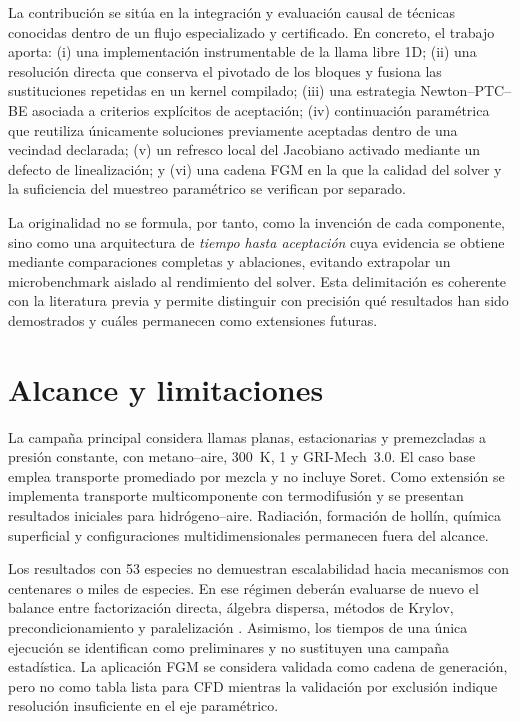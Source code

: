 \documentclass[12pt,a4paper,twoside,openany]{book}
\begin{document}
La contribución se sitúa en la integración y evaluación causal de técnicas
conocidas dentro de un flujo especializado y certificado. En concreto, el
trabajo aporta: (i) una implementación instrumentable de la llama libre 1D;
(ii) una resolución directa que conserva el pivotado de los bloques y fusiona
las sustituciones repetidas en un kernel compilado; (iii) una estrategia
Newton--PTC--BE asociada a criterios explícitos de aceptación; (iv) continuación
paramétrica que reutiliza únicamente soluciones previamente aceptadas dentro de
una vecindad declarada; (v) un refresco local del Jacobiano activado mediante un
defecto de linealización; y (vi) una cadena FGM en la que la calidad del solver
y la suficiencia del muestreo paramétrico se verifican por separado.

La originalidad no se formula, por tanto, como la invención de cada componente,
sino como una arquitectura de \emph{tiempo hasta aceptación} cuya evidencia se
obtiene mediante comparaciones completas y ablaciones, evitando extrapolar un
microbenchmark aislado al rendimiento del solver. Esta delimitación es
coherente con la literatura previa y permite distinguir con precisión qué
resultados han sido demostrados y cuáles permanecen como extensiones futuras.

\section{Alcance y limitaciones}

La campaña principal considera llamas planas, estacionarias y premezcladas a
presión constante, con metano--aire, \SI{300}{\kelvin},
\SI{1}{\atmosphere} y GRI-Mech~3.0. El caso base emplea transporte promediado
por mezcla y no incluye Soret. Como extensión se implementa transporte
multicomponente con termodifusión y se presentan resultados iniciales para
hidrógeno--aire. Radiación, formación de hollín, química superficial y
configuraciones multidimensionales permanecen fuera del alcance.

Los resultados con 53 especies no demuestran escalabilidad hacia mecanismos con
centenares o miles de especies. En ese régimen deberán evaluarse de nuevo el
balance entre factorización directa, álgebra dispersa, métodos de Krylov,
precondicionamiento y paralelización \cite{Lapointe2019,Wu2023,Perini2025}.
Asimismo, los tiempos de una única ejecución se identifican como preliminares y
no sustituyen una campaña estadística. La aplicación FGM se considera validada
como cadena de generación, pero no como tabla lista para CFD mientras la
validación por exclusión indique resolución insuficiente en el eje paramétrico.
\end{document}
